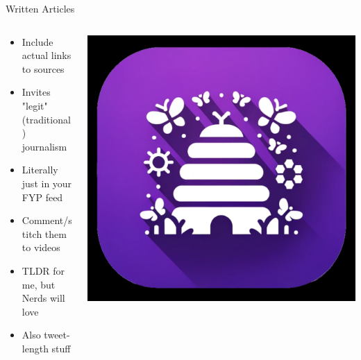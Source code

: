 \documentclass[aspectratio=169]{beamer}
\begin{document}
\begin{frame}{Written Articles}
\begin{columns}[T]
    \begin{column}[T]{0.5\textwidth}
        \begin{itemize}
            \item Include actual links to sources
            \item Invites "legit" (traditional) journalism
            \item Literally just in your FYP feed
            \item Comment/stitch them to videos
            \item TLDR for me, but Nerds will love
            \item Also tweet-length stuff
        \end{itemize}
    \end{column}
    \begin{column}{0.5\textwidth}
        \includegraphics[height=0.8\textheight]{imgs/app_icons/2.png}
    \end{column}
\end{columns}
\end{frame}
\end{document}
